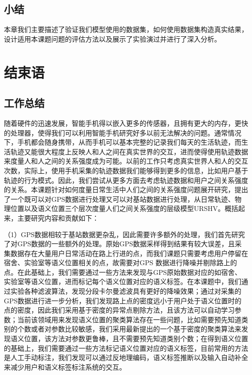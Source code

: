 \section{小结}
\label{sec:section5-4}
本章我们主要描述了验证我们模型使用的数据集，如何使用数据集构造真实结果，设计适用本课题问题的评估方法以及展示了实验演过并进行了深入分析。
\chapter{结束语}
\label{chap:chapter06}
\section{工作总结}
\label{sec:section6-1}
随着硬件的迅速发展，智能手机得以嵌入更多的传感器，且拥有更大的内存，更快的处理器，使得我们可以利用智能手机研究好多以前无法解决的问题。通常情况下，手机都会随身携带，从而手机可以基本完整的记录我们每天的生活轨迹，而生活轨迹又能很大程度上反映人和人之间在真实世界的交互，进而使得使用轨迹数据来度量人和人之间的关系强度成为可能。以前的工作只考虑真实世界人和人的交互次数，实际上，使用手机采集的轨迹数据我们能够得到更多的信息，比如用户基于轨迹的行为模式。因此，我们尝试从更多方面去考虑轨迹数据和用户之间关系强度的关系。本课题针对如何度量日常生活中人们之间的关系强度问题展开研究，提出了一个既可以对GPS数据进行处理又可以对基站数据进行处理，从日常轨迹、物理位置以及语义位置三个层次度量人们之间关系强度的层级模型URSHV。概括起来，主要研究内容和贡献如下：
\par （1）GPS数据相较于基站数据更杂乱，因此需要许多额外的处理，我们首先研究了对GPS数据的一些额外的处理。原始GPS数据采样得到结果有较大误差，且采集数据存在大量用户日常活动在路上行进的点，而我们课题只需要考虑用户停留在宿舍、实验室等语义位置相关的点，故需要对GPS 数据进行降噪并剔除路上的点。在此基础上，我们需要通过一些方法来发现与GPS原始数据对应的如宿舍、实验室等语义位置，进而标记每个语义位置对应的语义标签。在本课题中，我们通过实验各种滤波算法，发现分段卡尔曼滤波具有更好的降噪效果；通过对采集的GPS数据进行进一步分析，我们发现路上点的密度远小于用户处于语义位置时的点的密度，因此我们采用基于密度的异常点剔除方法，且该方法可以自动学习参数；当前该领域用来发现语义位置的聚类算法存在一些问题，比如需要预先知道类别的个数或者对参数比较敏感，我们采用最新提出的一个基于密度的聚类算法来发现语义位置，该方法对参数更鲁棒，且不需要预先知道类别个数；在得到语义位置的基础上，我们需要通过一些方法标记语义位置对应的语义标签，目前常用的方法是人工手动标注，我们发现可以通过反地理编码，语义标签推断以及输入自动补全来减少用户和语义标签标注系统的交互。
